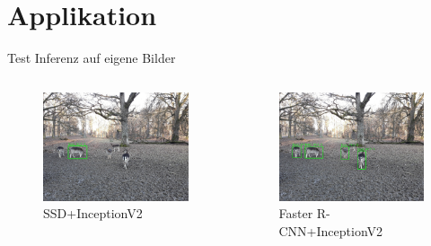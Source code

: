 \section[\thesection \  Applikation]{Applikation}\label{sec:application}

\begin{frame}{Test Inferenz auf eigene Bilder} %
        
    \begin{columns}
        \begin{figure}
            \centering
            \includegraphics[width=\textwidth]{Bilder/infer_result_ssd.jpg}
            \caption{SSD+InceptionV2}
        \end{figure}
        
        \begin{figure}
            \centering
            \includegraphics[width=\textwidth]{Bilder/infer_result_faster.jpg}
            \caption{Faster R-CNN+InceptionV2}
        \end{figure}
    \end{columns}

\end{frame}


